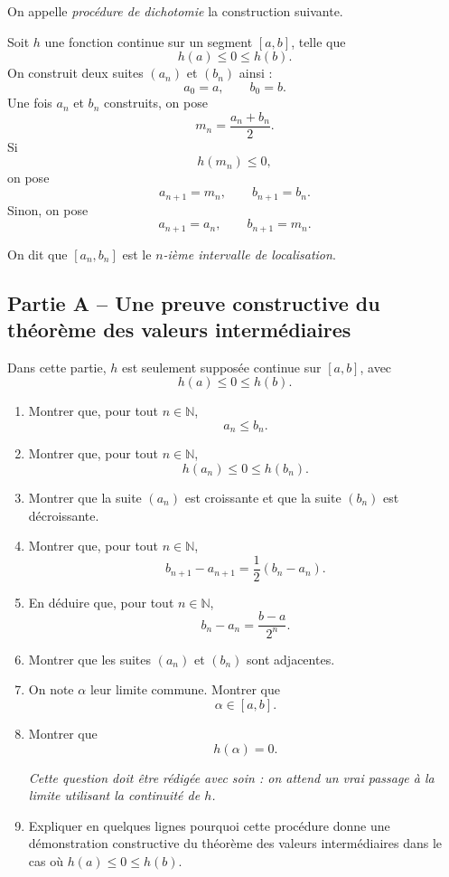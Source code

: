 \documentclass[11pt,a4paper]{article}
\newcommand{\N}{\mathbb{N}}
\begin{document}
\begin{notionbox}
On appelle \emph{procédure de dichotomie} la construction suivante.

Soit \(h\) une fonction continue sur un segment \([a,b]\), telle que
\[
h(a)\leq 0\leq h(b).
\]
On construit deux suites \((a_n)\) et \((b_n)\) ainsi :
\[
a_0=a,
\qquad
b_0=b.
\]
Une fois \(a_n\) et \(b_n\) construits, on pose
\[
m_n=\frac{a_n+b_n}{2}.
\]
Si
\[
h(m_n)\leq 0,
\]
on pose
\[
a_{n+1}=m_n,
\qquad
b_{n+1}=b_n.
\]
Sinon, on pose
\[
a_{n+1}=a_n,
\qquad
b_{n+1}=m_n.
\]

On dit que \([a_n,b_n]\) est le \emph{\(n\)-ième intervalle de localisation}.
\end{notionbox}


\subsection*{Partie A -- Une preuve constructive du théorème des valeurs intermédiaires}

Dans cette partie, \(h\) est seulement supposée continue sur \([a,b]\), avec
\[
h(a)\leq 0\leq h(b).
\]

\begin{enumerate}
    \item Montrer que, pour tout \(n\in\N\),
    \[
    a_n\leq b_n.
    \]

    \item Montrer que, pour tout \(n\in\N\),
    \[
    h(a_n)\leq 0\leq h(b_n).
    \]

    \item Montrer que la suite \((a_n)\) est croissante et que la suite \((b_n)\) est décroissante.

    \item Montrer que, pour tout \(n\in\N\),
    \[
    b_{n+1}-a_{n+1}
    =
    \frac12(b_n-a_n).
    \]

    \item En déduire que, pour tout \(n\in\N\),
    \[
    b_n-a_n=\frac{b-a}{2^n}.
    \]

    \item Montrer que les suites \((a_n)\) et \((b_n)\) sont adjacentes.

    \item On note \(\alpha\) leur limite commune. Montrer que
    \[
    \alpha\in [a,b].
    \]

    \item Montrer que
    \[
    h(\alpha)=0.
    \]

    \medskip

    \emph{Cette question doit être rédigée avec soin : on attend un vrai passage à la limite utilisant la continuité de \(h\).}

    \item Expliquer en quelques lignes pourquoi cette procédure donne une démonstration constructive du théorème des valeurs intermédiaires dans le cas où \(h(a)\leq 0\leq h(b)\).
\end{enumerate}
\end{document}
